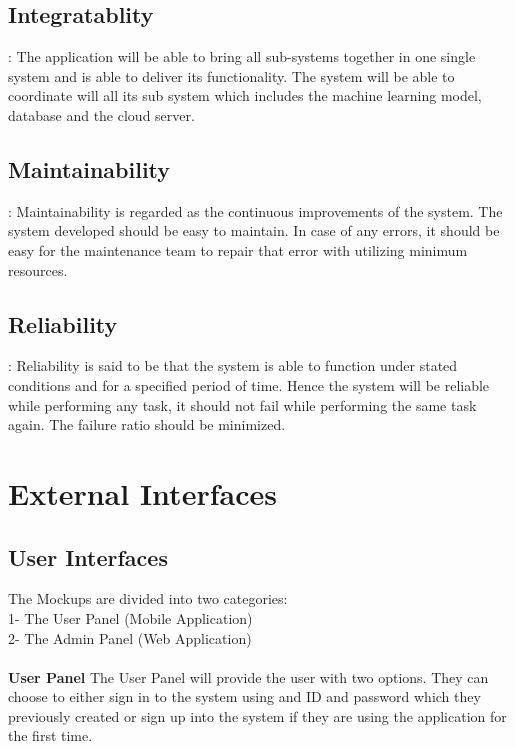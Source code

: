 \subsection{Integratablity}: 
The application will be able to bring all sub-systems together in one single system and is able to deliver its functionality. The system will be able to coordinate will all its sub system which includes the machine learning model, database and the cloud server.
\subsection{Maintainability}:
Maintainability is regarded as the continuous improvements of the system. The system developed should be easy to maintain. In case of any errors, it should be easy for the maintenance team to repair that error with utilizing minimum resources.
\subsection{Reliability}:
Reliability is said to be that the system is able to function under stated conditions and for a specified period of time. Hence the system will be reliable while performing any task, it should not fail while performing the same task again. The failure ratio should be minimized.



\newpage
\section{External Interfaces}

\subsection{User Interfaces}
The Mockups are divided into two categories:\\
1- The User Panel (Mobile Application) \\
2- The Admin Panel (Web Application)\\
\\
\textbf{User Panel}
The User Panel will provide the user with two options. They can choose to either sign in to the system using and ID and password which they previously created or sign up into the system if they are using the application for the first time. 


